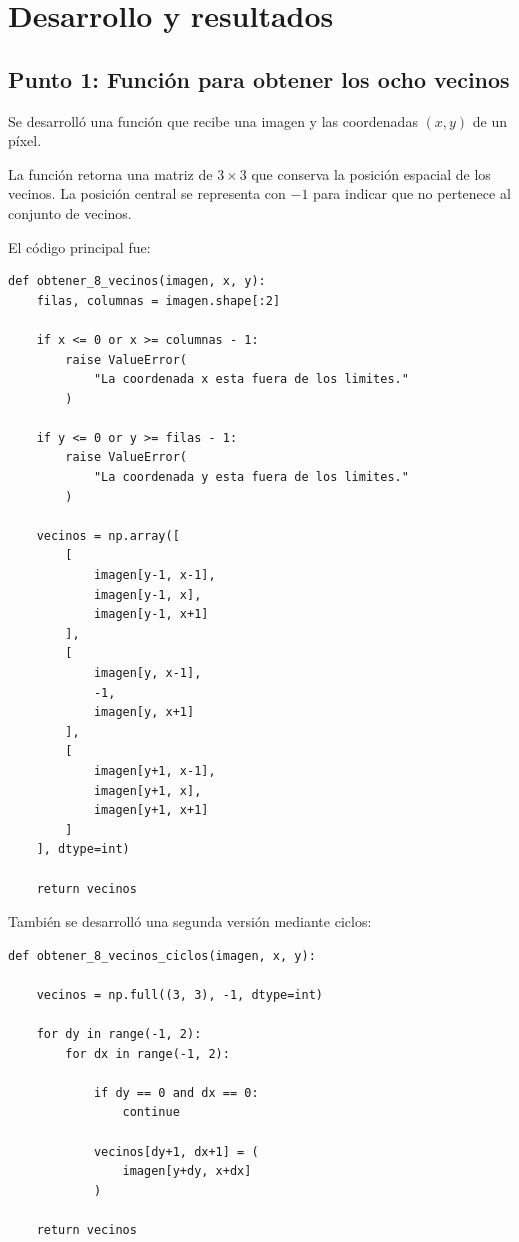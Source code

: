 \documentclass[11pt,letterpaper]{article}
\begin{document}
\section{Desarrollo y resultados}

\subsection{Punto 1: Función para obtener los ocho vecinos}

Se desarrolló una función que recibe una imagen y las coordenadas $(x,y)$ de un píxel.

La función retorna una matriz de $3\times3$ que conserva la posición espacial de los vecinos. La posición central se representa con $-1$ para indicar que no pertenece al conjunto de vecinos.

El código principal fue:

\begin{lstlisting}
def obtener_8_vecinos(imagen, x, y):
    filas, columnas = imagen.shape[:2]

    if x <= 0 or x >= columnas - 1:
        raise ValueError(
            "La coordenada x esta fuera de los limites."
        )

    if y <= 0 or y >= filas - 1:
        raise ValueError(
            "La coordenada y esta fuera de los limites."
        )

    vecinos = np.array([
        [
            imagen[y-1, x-1],
            imagen[y-1, x],
            imagen[y-1, x+1]
        ],
        [
            imagen[y, x-1],
            -1,
            imagen[y, x+1]
        ],
        [
            imagen[y+1, x-1],
            imagen[y+1, x],
            imagen[y+1, x+1]
        ]
    ], dtype=int)

    return vecinos
\end{lstlisting}

También se desarrolló una segunda versión mediante ciclos:

\begin{lstlisting}
def obtener_8_vecinos_ciclos(imagen, x, y):

    vecinos = np.full((3, 3), -1, dtype=int)

    for dy in range(-1, 2):
        for dx in range(-1, 2):

            if dy == 0 and dx == 0:
                continue

            vecinos[dy+1, dx+1] = (
                imagen[y+dy, x+dx]
            )

    return vecinos
\end{lstlisting}
\end{document}
